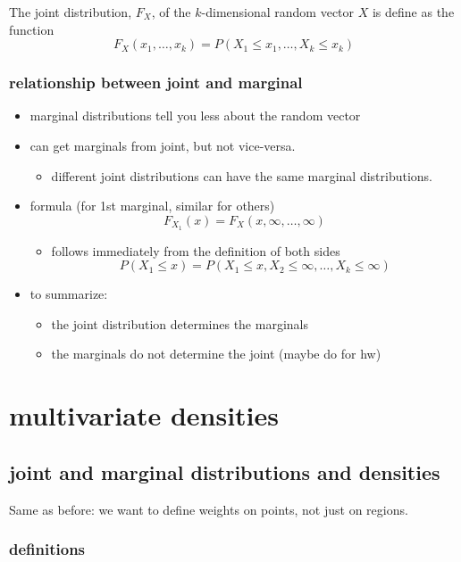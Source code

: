 \documentclass[11pt]{article}
\begin{document}
      The joint distribution, $F_X$, of the $k$-dimensional random
      vector $X$ is define as the function 
      \[ F_X(x_1,\dots,x_k) = P(X_1 \leq x_1,\dots,X_k \leq x_k) \]
\subsubsection{relationship between joint and marginal}
\label{sec-1-2-2}

\begin{itemize}
\item marginal distributions tell you less about the random vector
\item can get marginals from joint, but not vice-versa.
\begin{itemize}
\item different joint distributions can have the same marginal
          distributions.
\end{itemize}
\item formula (for 1st marginal, similar for others)
        \[ F_{X_1}(x) = F_X(x, \infty, \dots,\infty) \]
\begin{itemize}
\item follows immediately from the definition of both sides
          \[ P(X_1 \leq x) = P(X_1 \leq x, X_2 \leq \infty, \dots, X_k
          \leq \infty) \]
\end{itemize}
\item to summarize:
\begin{itemize}
\item the joint distribution determines the marginals
\item the marginals do not determine the joint (maybe do for hw)
\end{itemize}
\end{itemize}
\section{multivariate densities}
\label{sec-2}
\subsection{joint and marginal distributions and densities}
\label{sec-2-1}

      Same as before: we want to define weights on points, not just on
      regions.
\subsubsection{definitions}
\label{sec-2-1-1}
\end{document}
